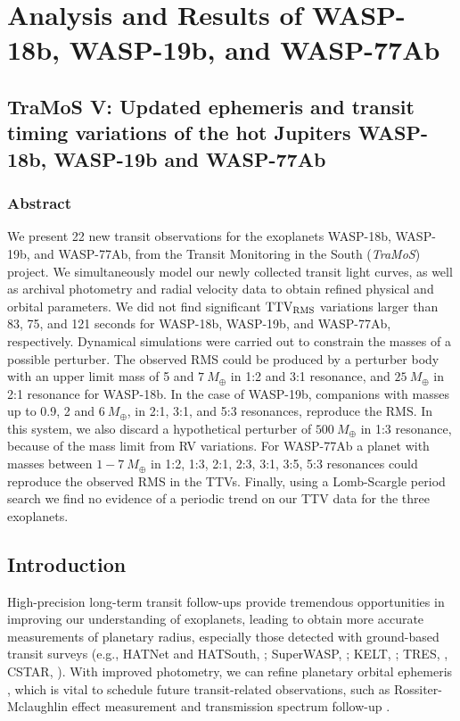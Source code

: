 \chapter{Analysis and Results of WASP-18b, WASP-19b, and WASP-77Ab}\label{chap:paper}

\section*{TraMoS V: Updated ephemeris and transit timing variations of the hot Jupiters WASP-18b, WASP-19b and WASP-77Ab}


\subsection*{Abstract}

We present 22 new transit observations for the exoplanets WASP-18b, WASP-19b, and WASP-77Ab, from the Transit Monitoring in the South (\emph{TraMoS}) project. We simultaneously model our newly collected transit light curves, as well as archival photometry and radial velocity data to obtain refined physical and orbital parameters. We did not find significant $\rm TTV_{RMS}$ variations larger than 83, 75, and 121 seconds for WASP-18b, WASP-19b, and WASP-77Ab, respectively. Dynamical simulations were carried out to constrain the masses of a possible perturber. The observed RMS could be produced by a perturber body with an upper limit mass of 5 and $7~M_{\oplus}$ in 1:2 and 3:1 resonance, and $25~M_{\oplus}$ in 2:1 resonance for WASP-18b. In the case of WASP-19b, companions with masses up to 0.9, 2 and $6~M_{\oplus}$, in 2:1, 3:1, and 5:3 resonances, reproduce the RMS. In this system, we also discard a hypothetical perturber of $500~M_{\oplus}$ in 1:3 resonance, because of the mass limit from RV variations. For WASP-77Ab a planet with masses between $1-7~M_{\oplus}$ in 1:2, 1:3, 2:1, 2:3, 3:1, 3:5, 5:3 resonances could reproduce the observed RMS in the TTVs. Finally, using a Lomb-Scargle period search we find no evidence of a periodic trend on our TTV data for the three exoplanets.

\section{Introduction}

High-precision long-term transit follow-ups provide tremendous opportunities in improving our understanding of exoplanets, leading to obtain more accurate measurements of planetary radius, especially those detected with ground-based transit surveys (e.g., HATNet and HATSouth, \citealt{Bakos2012}; SuperWASP, \citealt{Pollacco2006}; KELT, \citealt{Pepper2007}; TRES, \citealt{Alonso2007}, CSTAR, \citealt{WangS2014}). With improved photometry, we can refine planetary orbital ephemeris \citep{TEMP1}, which is vital to schedule future transit-related observations, such as Rossiter-Mclaughlin effect measurement \citep{Nutzman2011,Sanchis2011,Sanchis2013,WangS2018} and transmission spectrum follow-up \citep{Mancini2016b,Mackebrandt2017}.

